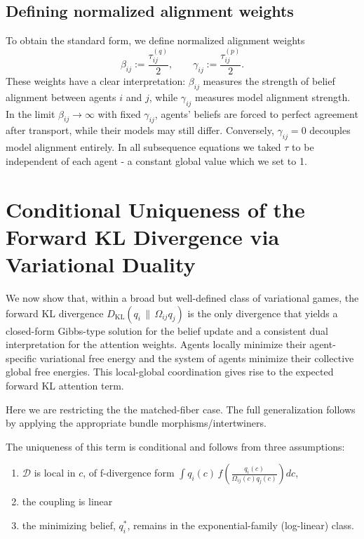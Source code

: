 \documentclass[11pt]{article}
\begin{document}
\subsection{Defining normalized alignment weights}
To obtain the standard form, we define normalized alignment weights
\begin{equation}
\beta_{ij}:=\frac{\tau^{(q)}_{ij}}{2},
\qquad
\gamma_{ij}:=\frac{\tau^{(p)}_{ij}}{2}.
\label{eq:normalized_weights}
\end{equation}
These weights have a clear interpretation: $\beta_{ij}$ measures the strength of belief alignment between agents $i$ and $j$, while $\gamma_{ij}$ measures model alignment strength. In the limit $\beta_{ij} \to \infty$ with fixed $\gamma_{ij}$, agents' beliefs are forced to perfect agreement after transport, while their models may still differ. Conversely, $\gamma_{ij} = 0$ decouples model alignment entirely. In all subsequence equations we taked $\tau$ to be independent of each agent - a constant global value which we set to 1.







\section{Conditional Uniqueness of the Forward KL Divergence via Variational Duality}

We now show that, within a broad but well-defined class of variational games, the forward KL divergence $D_{\mathrm{KL}}(q_i \,\|\, \Omega_{ij} q_j)$ is the only divergence that yields a closed-form Gibbs-type solution for the belief update and a consistent dual interpretation for the attention weights.  Agents locally minimize their agent-specific variational free energy and the system of agents minimize their collective global free energies.  This local-global coordination gives rise to the expected forward KL attention term.

Here we are restricting the the matched-fiber case.  The full generalization follows by applying the appropriate bundle morphisms/intertwiners.

The uniqueness of this term is conditional and follows from three assumptions:

\begin{enumerate}
  \item $\mathcal{D}$ is local in $c$, of f-divergence form $\displaystyle \int q_i(c)\, f\!\left(\frac{q_i(c)}{\Omega_{ij}(c) q_j(c)}\right) dc$,
  \item the coupling is linear
  \item the minimizing belief, $q_i^*$, remains in the exponential-family (log-linear) class.
\end{enumerate}
\end{document}
